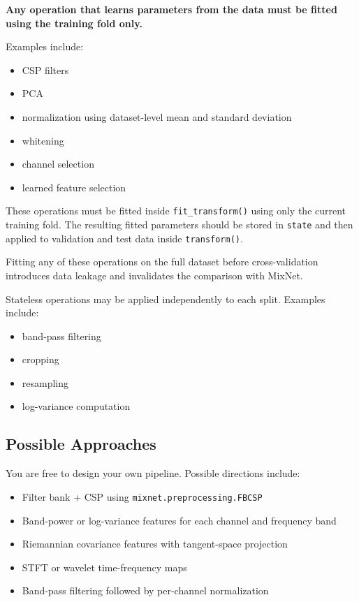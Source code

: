 \documentclass[
  10pt,
]{article}
\begin{document}
\textbf{Any operation that learns parameters from the data must be
fitted using the training fold only.}

Examples include:

\begin{itemize}
\item
  CSP filters
\item
  PCA
\item
  normalization using dataset-level mean and standard deviation
\item
  whitening
\item
  channel selection
\item
  learned feature selection
\end{itemize}

These operations must be fitted inside \texttt{fit\_transform()} using
only the current training fold. The resulting fitted parameters should
be stored in \texttt{state} and then applied to validation and test
data inside \texttt{transform()}.

Fitting any of these operations on the full dataset before
cross-validation introduces data leakage and invalidates the
comparison with MixNet.

Stateless operations may be applied independently to each split.
Examples include:

\begin{itemize}
\item
  band-pass filtering
\item
  cropping
\item
  resampling
\item
  log-variance computation
\end{itemize}

\subsection{Possible Approaches}\label{possible-approaches}

You are free to design your own pipeline. Possible directions include:

\begin{itemize}
\item
  Filter bank + CSP using \texttt{mixnet.preprocessing.FBCSP}
\item
  Band-power or log-variance features for each channel and frequency
  band
\item
  Riemannian covariance features with tangent-space projection
\item
  STFT or wavelet time-frequency maps
\item
  Band-pass filtering followed by per-channel normalization
\end{itemize}
\end{document}
